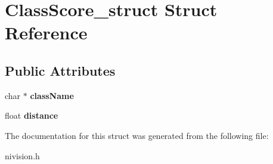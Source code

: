 \hypertarget{structClassScore__struct}{
\section{ClassScore\_\-struct Struct Reference}
\label{structClassScore__struct}
}
\subsection*{Public Attributes}
\begin{DoxyCompactItemize}
\item 
\hypertarget{structClassScore__struct_a07f86f7b9c0ba81aeec633ea4183cd4e}{
char $\ast$ {\bfseries className}}
\label{structClassScore__struct_a07f86f7b9c0ba81aeec633ea4183cd4e}

\item 
\hypertarget{structClassScore__struct_a42c180b379cef0f68d6fb197a7f3e349}{
float {\bfseries distance}}
\label{structClassScore__struct_a42c180b379cef0f68d6fb197a7f3e349}

\end{DoxyCompactItemize}


The documentation for this struct was generated from the following file:\begin{DoxyCompactItemize}
\item 
nivision.h\end{DoxyCompactItemize}
